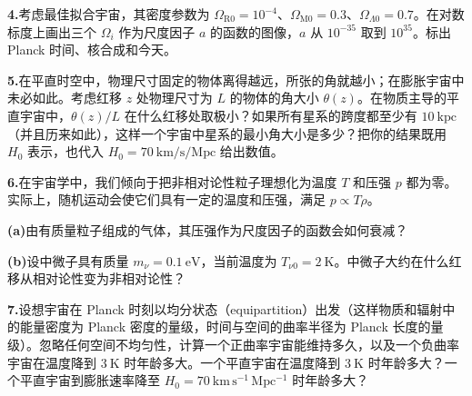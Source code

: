 \textbf{4.}\quad 考虑最佳拟合宇宙，其密度参数为 $\Omega_{\mathrm{R}0}=10^{-4}$、$\Omega_{\mathrm{M}0}=0.3$、$\Omega_{\Lambda0}=0.7$。在对数标度上画出三个 $\Omega_{i}$ 作为尺度因子 $a$ 的函数的图像，$a$ 从 $10^{-35}$ 取到 $10^{35}$。标出 Planck 时间、核合成和今天。

\textbf{5.}\quad 在平直时空中，物理尺寸固定的物体离得越远，所张的角就越小；在膨胀宇宙中未必如此。考虑红移 $z$ 处物理尺寸为 $L$ 的物体的角大小 $\theta(z)$。在物质主导的平直宇宙中，$\theta(z)/L$ 在什么红移处取极小？如果所有星系的跨度都至少有 $10~\mathrm{kpc}$（并且历来如此），这样一个宇宙中星系的最小角大小是多少？把你的结果既用 $H_{0}$ 表示，也代入 $H_{0}=70~\mathrm{km/s/Mpc}$ 给出数值。

\textbf{6.}\quad 在宇宙学中，我们倾向于把非相对论性粒子理想化为温度 $T$ 和压强 $p$ 都为零。实际上，随机运动会使它们具有一定的温度和压强，满足 $p\propto T\rho$。

\textbf{(a)}\quad 由有质量粒子组成的气体，其压强作为尺度因子的函数会如何衰减？

\textbf{(b)}\quad 设中微子具有质量 $m_{\nu}=0.1~\mathrm{eV}$，当前温度为 $T_{\nu 0}=2~\mathrm{K}$。中微子大约在什么红移从相对论性变为非相对论性？

\textbf{7.}\quad 设想宇宙在 Planck 时刻以均分状态（equipartition）出发（这样物质和辐射中的能量密度为 Planck 密度的量级，时间与空间的曲率半径为 Planck 长度的量级）。忽略任何空间不均匀性，计算一个正曲率宇宙能维持多久，以及一个负曲率宇宙在温度降到 $3~\mathrm{K}$ 时年龄多大。一个平直宇宙在温度降到 $3~\mathrm{K}$ 时年龄多大？一个平直宇宙到膨胀速率降至 $H_{0}=70~\mathrm{km\,s^{-1}\,Mpc^{-1}}$ 时年龄多大？

